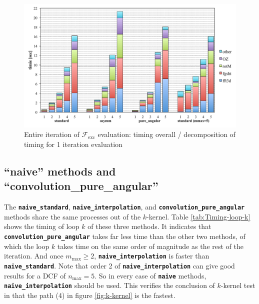 \begin{figure}[H]
\begin{centering}
\includegraphics[width=0.9\columnwidth]{_figure/results/branch_perf}
\par\end{centering}
\caption[Entire iteration of $\mathcal{F}_{\mathrm{exc}}$ evaluation]{Entire iteration of $\mathcal{F}_{\mathrm{exc}}$ evaluation: timing
overall / decomposition of timing for 1 iteration evaluation\label{fig:Entire-iteration}}
\end{figure}


\subsection{``naive'' methods and ``convolution\_pure\_angular''\label{subsec:Comparison-between-naive_standar}}

The \texttt{\textbf{naive\_standard}}, \texttt{\textbf{naive\_interpolation}},
and \texttt{\textbf{convolution\_pure\_angular}} methods share the
same processes out of the $k$-kernel. Table \ref{tab:Timing-loop-k}
shows the timing of loop $k$ of these three methods. It indicates
that \texttt{\textbf{convolution\_pure\_angular}} takes far less time
than the other two methods, of which the loop $k$ takes time on the
same order of magnitude as the rest of the iteration. And once $m_{\max}\geq2$,
\texttt{\textbf{naive\_interpolation}} is faster than \texttt{\textbf{naive\_standard}}.
Note that order 2 of \texttt{\textbf{naive\_interpolation}} can give
good results for a \acs{DCF} of $n_{\max}=5$. So in every case of
\texttt{\textbf{naive}} methods, \texttt{\textbf{naive\_interpolation}}
should be used. This verifies the conclusion of $k$-kernel test in
that the path (4) in figure \ref{fig:k-kernel} is the fastest.

